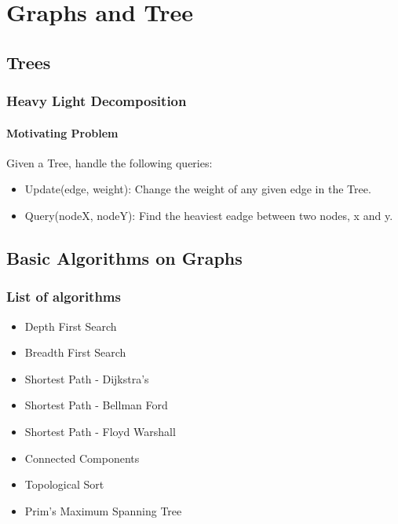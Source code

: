 \chapter{Graphs and Tree}



\section{Trees}


\subsection{Heavy Light Decomposition}

\subsubsection{Motivating Problem}

Given a Tree, handle the following queries:
\begin{itemize}
  \item Update(edge, weight): Change the weight of any given edge in the Tree.
  \item Query(nodeX, nodeY): Find the heaviest eadge between two nodes, x and y.
\end{itemize}


\section{Basic Algorithms on Graphs}


\subsection{List of algorithms}

\begin{itemize}
  \item Depth First Search
  \item Breadth First Search
  \item Shortest Path - Dijkstra's
  \item Shortest Path - Bellman Ford
  \item Shortest Path - Floyd Warshall
  \item Connected Components
  \item Topological Sort
  \item Prim's Maximum Spanning Tree

\end{itemize}

